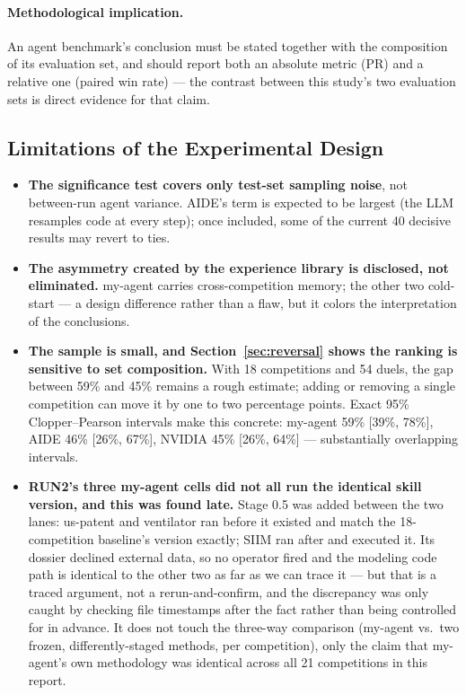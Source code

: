 \documentclass[11pt,a4paper]{article}
\begin{document}
\paragraph{Methodological implication.} An agent benchmark's conclusion must be stated together with the composition of its evaluation set, and should report both an absolute metric (PR) and a relative one (paired win rate) --- the contrast between this study's two evaluation sets is direct evidence for that claim.

\subsection{Limitations of the Experimental Design}
\label{sec:limitations}

\begin{itemize}[leftmargin=*]
  \item \textbf{The significance test covers only test-set sampling noise}, not between-run agent variance. AIDE's term is expected to be largest (the LLM resamples code at every step); once included, some of the current 40 decisive results may revert to ties.
  \item \textbf{The asymmetry created by the experience library is disclosed, not eliminated.} my-agent carries cross-competition memory; the other two cold-start --- a design difference rather than a flaw, but it colors the interpretation of the conclusions.
  \item \textbf{The sample is small, and Section~\ref{sec:reversal} shows the ranking is sensitive to set composition.} With 18 competitions and 54 duels, the gap between 59\% and 45\% remains a rough estimate; adding or removing a single competition can move it by one to two percentage points. Exact 95\% Clopper--Pearson intervals make this concrete: my-agent 59\% [39\%, 78\%], AIDE 46\% [26\%, 67\%], NVIDIA 45\% [26\%, 64\%] --- substantially overlapping intervals.
  \item \textbf{RUN2's three my-agent cells did not all run the identical skill version, and this was found late.} Stage 0.5 was added between the two lanes: us-patent and ventilator ran before it existed and match the 18-competition baseline's version exactly; SIIM ran after and executed it. Its dossier declined external data, so no operator fired and the modeling code path is identical to the other two as far as we can trace it --- but that is a traced argument, not a rerun-and-confirm, and the discrepancy was only caught by checking file timestamps after the fact rather than being controlled for in advance. It does not touch the three-way comparison (my-agent vs.\ two frozen, differently-staged methods, per competition), only the claim that my-agent's own methodology was identical across all 21 competitions in this report.
\end{itemize}
\end{document}
